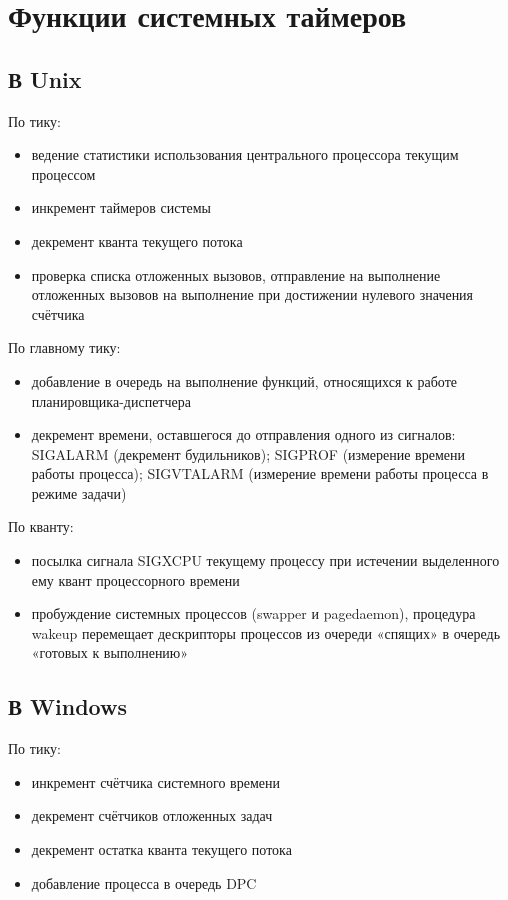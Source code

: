 \chapter{Функции системных таймеров}

\section{В Unix}
По тику:
\begin{itemize}
	\item ведение статистики использования центрального процессора текущим процессом
	\item инкремент таймеров системы
	\item декремент кванта текущего потока
	\item проверка списка отложенных вызовов, отправление на выполнение отложенных вызовов на выполнение при достижении нулевого значения счётчика
\end{itemize}

По главному тику:
\begin{itemize}
	\item добавление в очередь на выполнение функций, относящихся к работе
	планировщика-диспетчера
	\item декремент времени, оставшегося до отправления одного из сигналов:
	SIGALARM (декремент будильников); SIGPROF (измерение времени работы процесса); SIGVTALARM (измерение времени работы процесса в режиме задачи)
\end{itemize}

По кванту:
\begin{itemize}
	\item посылка сигнала SIGXCPU текущему процессу  при истечении выделенного ему квант процессорного времени
	\item пробуждение системных процессов (swapper и pagedaemon), процедура
	wakeup перемещает дескрипторы процессов из очереди «спящих» в очередь «готовых к выполнению»
\end{itemize}

\section{В Windows}
По тику:
\begin{itemize}
	\item инкремент счётчика системного времени
	\item декремент счётчиков отложенных задач
	\item декремент остатка кванта текущего потока
	\item добавление процесса в очередь DPC
\end{itemize}

